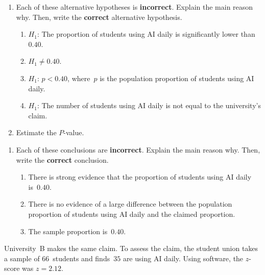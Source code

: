 \documentclass[
  11pt,
  a4paper,
  krantz2]{krantz}
\providecommand{\tightlist}{%
  \setlength{\itemsep}{0pt}\setlength{\parskip}{0pt}}
\newlength{\greyboxheight}
\newcommand{\setgreyboxheight}[1]{%
  \setlength{\greyboxheight}{2.3\baselineskip * #1}%
}
\newenvironment{greybox}[1]{%
  \nopagebreak
  \setgreyboxheight{#1}%
  \begin{tcolorbox}[
    colframe=gray!30!black,
    boxrule=2pt,
    width=\linewidth,
    height=\greyboxheight,
    valign=center,
    colback=white,
    left=4pt,
    right=4pt, 
    top=4pt, 
    bottom=4pt,
    before skip=4pt,
    after skip=4pt
  ]
\vspace*{\greyboxheight} %
}{%
  \end{tcolorbox}
  \goodbreak
}
\newcommand{\answerbox}[1]{\noindent\begin{greybox}{#1}\end{greybox}}
\begin{document}
\begin{enumerate}
\def\labelenumi{\arabic{enumi}.}
\item
  Each of these alternative hypotheses is \textbf{incorrect}.
  Explain the main reason why.
  Then, write the \textbf{correct} alternative hypothesis.

  \begin{enumerate}
  \def\labelenumii{\alph{enumii}.}
  \tightlist
  \item
    \(H_1\): The proportion of students using AI daily is significantly lower than~\(0.40\).
  \item
    \(H_1 \ne 0.40\).
  \item
    \(H_1\): \(p < 0.40\), where~\(p\) is the population proportion of students using AI daily.
  \item
    \(H_1\): The number of students using AI daily is not equal to the university's claim.
    \answerbox{3}
  \end{enumerate}
\item
  Estimate the \(P\)-value.
  \answerbox{2}
\end{enumerate}

\pagebreak

\begin{enumerate}
\def\labelenumi{\arabic{enumi}.}
\setcounter{enumi}{2}
\item
  Each of these conclusions are \textbf{incorrect}.
  Explain the main reason why.
  Then, write the \textbf{correct} conclusion.

  \begin{enumerate}
  \def\labelenumii{\alph{enumii}.}
  \tightlist
  \item
    There is strong evidence that the proportion of students using AI daily is~\(0.40\).
  \item
    There is no evidence of a large difference between the population proportion of students using AI daily and the claimed proportion.
  \item
    The sample proportion is~\(0.40\).
    \answerbox{3}
  \end{enumerate}
\end{enumerate}

University~B makes the same claim.
To assess the claim, the student union takes a sample of \(66\)~students and finds~\(35\) are using AI daily.
Using software, the \(z\)-score was \(z = 2.12\).
\end{document}
